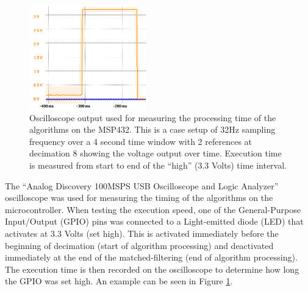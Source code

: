 \documentclass[conference]{IEEEtran}
\begin{document}
\begin{figure}[!ht]
   \centering
   \includegraphics[width=0.45\textwidth]{reference_pulse_32Hz_4sec_8downsample_2.png}
   \caption{Oscilloscope output used for measuring the processing time of the algorithms on the MSP432. This is a case setup of 32Hz sampling frequency over a 4 second time window with 2 references at decimation 8 showing the voltage output over time. Execution time is measured from start to end of the ``high'' (3.3 Volts) time interval.}
   \label{fig:time_measure}
\end{figure}
%
The ``Analog Discovery 100MSPS USB Oscilloscope and Logic Analyzer'' oscilloscope was used for measuring the timing of the algorithms on the microcontroller.
When testing the execution speed, one of the General-Purpose Input/Output (GPIO) pins was connected to a Light-emitted diode (LED) that activates at 3.3 Volts (set high).
This is activated immediately before the beginning of decimation (start of algorithm processing) and deactivated immediately at the end of the matched-filtering (end of algorithm processing).
The execution time is then recorded on the oscilloscope to determine how long the GPIO was set high.
An example can be seen in Figure \ref{fig:time_measure}.
\end{document}

